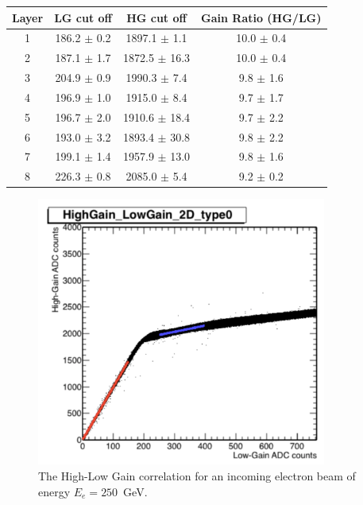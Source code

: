 %                                                                                                                                             
\begin{table}[htbp]
  \begin{center}
    \begin{tabular}{|c|c|c|c|}
      \hline
      Layer             & LG cut off       & HG cut off         & Gain Ratio (HG/LG) \\
      \hline
      1         & 186.2 $\pm$ 0.2  & 1897.1 $\pm$ 1.1   & 10.0 $\pm$ 0.4  \\
      2         & 187.1 $\pm$ 1.7  & 1872.5 $\pm$ 16.3  & 10.0 $\pm$ 0.4  \\
      3         & 204.9 $\pm$ 0.9  & 1990.3 $\pm$ 7.4   & 9.8  $\pm$ 1.6  \\
      4         & 196.9 $\pm$ 1.0  & 1915.0 $\pm$ 8.4   & 9.7  $\pm$ 1.7  \\
      5         & 196.7 $\pm$ 2.0  & 1910.6 $\pm$ 18.4  & 9.7  $\pm$ 2.2  \\
      6         & 193.0 $\pm$ 3.2  & 1893.4 $\pm$ 30.8  & 9.8  $\pm$ 2.2  \\
      7         & 199.1 $\pm$ 1.4  & 1957.9 $\pm$ 13.0  & 9.8  $\pm$ 1.6  \\
      8         & 226.3 $\pm$ 0.8  & 2085.0 $\pm$ 5.4   & 9.2  $\pm$ 0.2  \\
      \hline
    \end{tabular}
    \label{tab:saturation}
  \end{center}
\end{table}

\begin{figure}[htbp]
  \begin{center}
    \includegraphics[width=0.85\textwidth]{Fig1_HGC.pdf}
    \caption{The High-Low Gain correlation for an incoming electron beam of energy $E_{e}=250$~GeV.}
    \label{fig:hglg}
  \end{center}
\end{figure}
\clearpage
\newpage




